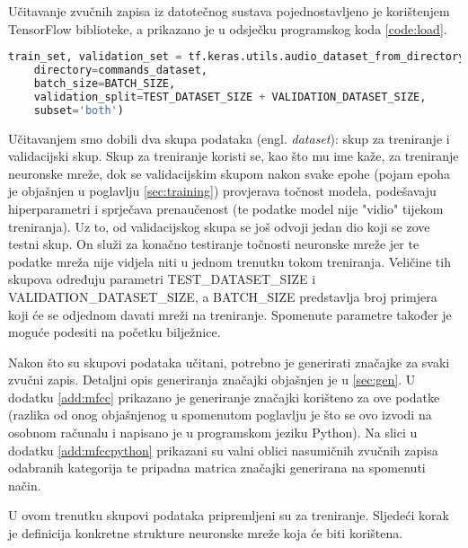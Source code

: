 Učitavanje zvučnih zapisa iz datotečnog sustava pojednostavljeno je korištenjem
TensorFlow biblioteke, a prikazano je u odsječku programskog koda \ref{code:load}.

\begin{lstlisting}[language=Python, caption=Učitavanje zvučnih zapisa, label=code:load]
train_set, validation_set = tf.keras.utils.audio_dataset_from_directory(
    directory=commands_dataset,
    batch_size=BATCH_SIZE,
    validation_split=TEST_DATASET_SIZE + VALIDATION_DATASET_SIZE,
    subset='both')
\end{lstlisting}

Učitavanjem smo dobili dva skupa podataka (engl. \textit{dataset}): skup za treniranje i validacijski skup.
Skup za treniranje koristi se, kao što mu ime kaže, za treniranje neuronske mreže,
dok se validacijskim skupom nakon svake epohe (pojam epoha je objašnjen u poglavlju \ref{sec:training}) 
provjerava točnost modela, podešavaju
hiperparametri i sprječava prenaučenost (te podatke model nije "vidio" tijekom treniranja).
Uz to, od validacijskog skupa se još odvoji jedan dio koji se zove testni skup. On služi
za konačno testiranje točnosti neuronske mreže jer te podatke mreža nije vidjela niti
u jednom trenutku tokom treniranja. Veličine tih skupova određuju parametri 
TEST\_DATASET\_SIZE i VALIDATION\_DATASET\_SIZE, a BATCH\_SIZE predstavlja
broj primjera koji će se odjednom davati mreži na treniranje. Spomenute parametre
također je moguće podesiti na početku bilježnice. 

Nakon što su skupovi podataka učitani, potrebno je generirati značajke za svaki zvučni zapis.
Detaljni opis generiranja značajki objašnjen je u \ref{sec:gen}. U dodatku \ref{add:mfcc} prikazano
je generiranje značajki korišteno za ove podatke (razlika od onog objašnjenog u spomenutom poglavlju
je što se ovo izvodi na osobnom računalu i napisano je u programskom jeziku Python).
Na slici u dodatku \ref{add:mfccpython} prikazani su valni oblici nasumičnih zvučnih zapisa odabranih 
kategorija te pripadna matrica značajki generirana na spomenuti način.

U ovom trenutku skupovi podataka pripremljeni su za treniranje. Sljedeći korak je definicija 
konkretne strukture neuronske mreže koja će biti korištena.